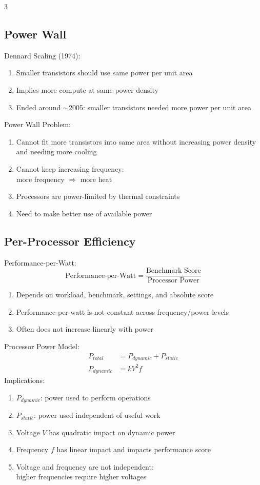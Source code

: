 \documentclass[12pt, a4paper]{article}
\begin{document}
\begin{multicols*}{3}
\subsection{Power Wall}

Dennard Scaling (1974):
\begin{enumerate}[\roman*.]
  \item Smaller transistors should use same power per unit area
  \item Implies more compute at same power density
  \item Ended around $\sim$2005: smaller transistors needed more power per unit area
\end{enumerate}

Power Wall Problem:
\begin{enumerate}[\roman*.]
  \item Cannot fit more transistors into same area without increasing power density and needing more cooling
  \item Cannot keep increasing frequency:\\more frequency $\Rightarrow$ more heat
  \item Processors are power-limited by thermal constraints
  \item Need to make better use of available power
\end{enumerate}

\colbreak
\subsection{Per-Processor Efficiency}

Performance-per-Watt:
\[
  \text{Performance-per-Watt}
  =
  \frac{\text{Benchmark Score}}{\text{Processor Power}}
\]
\begin{enumerate}[\roman*.]
  \item Depends on workload, benchmark, settings, and absolute score
  \item Performance-per-watt is not constant across frequency/power levels
  \item Often does not increase linearly with power
\end{enumerate}

Processor Power Model:
\begin{align*}
  P_{total} &= P_{dynamic} + P_{static}\\
  P_{dynamic} &= kV^2f
\end{align*}
Implications:
\begin{enumerate}[\roman*.]
  \item $P_{dynamic}$: power used to perform operations
  \item $P_{static}$: power used independent of useful work
  \item Voltage $V$ has quadratic impact on dynamic power
  \item Frequency $f$ has linear impact and impacts performance score
  \item Voltage and frequency are not independent:\\higher frequencies require higher voltages
\end{enumerate}


\end{multicols*}
\end{document}
